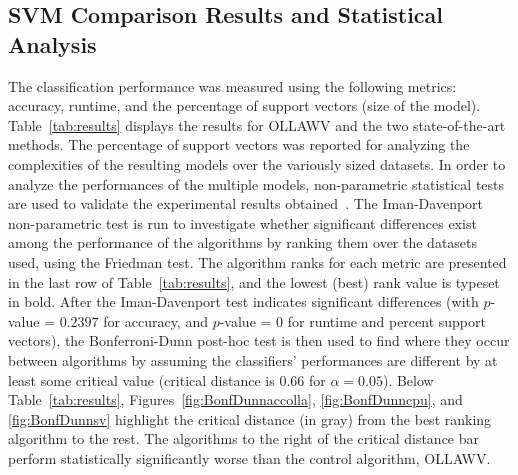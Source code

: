 \documentclass[reqno]{vcuthesis}
\numberwithin{equation}{chapter}
\begin{document}
\begin{table}[t!]
\begin{minipage}{0.3\textwidth}
{}
\captionsetup{width=0.95\linewidth}
\label{fig:BonfDunnsv}
\end{minipage}
\end{table}

\subsection{SVM Comparison Results and Statistical Analysis}\label{subsec:ollawvresults}
The classification performance was measured using the following metrics: accuracy, runtime, and the percentage of support vectors (size of the model). Table~\ref{tab:results} displays the results for OLLAWV and the two state-of-the-art methods. The percentage of support vectors was reported for analyzing the complexities of the resulting models over the variously sized datasets. In order to analyze the performances of the multiple models, non-parametric statistical tests are used to validate the experimental results obtained~\cite{Derrac2011}. The Iman-Davenport non-parametric test is run to investigate whether significant differences exist among the performance of the algorithms by ranking them over the datasets used, using the Friedman test. The algorithm ranks for each metric are presented in the last row of Table~\ref{tab:results}, and the lowest (best) rank value is typeset in bold. After the Iman-Davenport test indicates significant differences (with $p$-value =  $0.2397$ for accuracy, and $p$-value =  $0$ for runtime and percent support vectors), the Bonferroni-Dunn post-hoc test is then used to find where they occur between algorithms by assuming the classifiers' performances are different by at least some critical value (critical distance is $0.66$ for $\alpha = 0.05$). Below Table~\ref{tab:results}, Figures~\ref{fig:BonfDunnaccolla}, \ref{fig:BonfDunncpu}, and \ref{fig:BonfDunnsv} highlight the critical distance (in gray) from the best ranking algorithm to the rest. The algorithms to the right of the critical distance bar perform statistically significantly worse than the control algorithm, OLLAWV.
\end{document}
